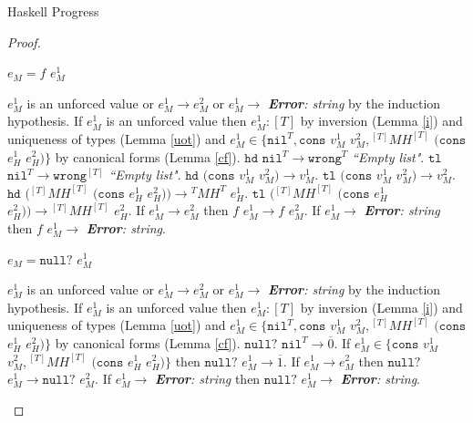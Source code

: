 \begin{theorem}{Haskell Progress}
\begin{proof}
\begin{case}
\end{case}


\begin{case}

$e_{M}=f$ $e_{M}^{1}$

$e_{M}^{1}$ is an unforced value or $e_{M}^{1}\rightarrow e_{M}^{2}$ or $e_{M}^{1}\rightarrow$ \emph{\textbf{Error}: string} by the induction hypothesis.  If $e_{M}^{1}$ is an unforced value then $e_{M}^{1}:[T]$ by inversion (Lemma \ref{i}) and uniqueness of types (Lemma \ref{uot}) and $e_{M}^{1}\in\lbrace\mathtt{nil}^{T},\mathtt{cons}$ $v_{M}^{1}$ $v_{M}^{2},{^{[T]}M}H^{[T]}$ $(\mathtt{cons}$ $e_{H}^{1}$ $e_{H}^{2})\rbrace$ by canonical forms (Lemma \ref{cf}).  $\mathtt{hd}$ $\mathtt{nil}^{T}\rightarrow\mathtt{wrong}^{T}$ \emph{``Empty list"}.  $\mathtt{tl}$ $\mathtt{nil}^{T}\rightarrow\mathtt{wrong}^{[T]}$ \emph{``Empty list"}.  $\mathtt{hd}$ $(\mathtt{cons}$ $v_{M}^{1}$ $v_{M}^{2})\rightarrow v_{M}^{1}$.  $\mathtt{tl}$ $(\mathtt{cons}$ $v_{M}^{1}$ $v_{M}^{2})\rightarrow v_{M}^{2}$.  $\mathtt{hd}$ $({^{[T]}M}H^{[T]}$ $(\mathtt{cons}$ $e_{H}^{1}$ $e_{H}^{2}))\rightarrow{^{T}M}H^{T}$ $e_{H}^{1}$.  $\mathtt{tl}$ $({^{[T]}M}H^{[T]}$ $(\mathtt{cons}$ $e_{H}^{1}$ $e_{H}^{2}))\rightarrow{^{[T]}M}H^{[T]}$ $e_{H}^{2}$.  If $e_{M}^{1}\rightarrow e_{M}^{2}$ then $f$ $e_{M}^{1}\rightarrow f$ $e_{M}^{2}$.  If $e_{M}^{1}\rightarrow$ \emph{\textbf{Error}: string} then $f$ $e_{M}^{1}\rightarrow$ \emph{\textbf{Error}: string}.

\end{case}


\begin{case}

$e_{M}=\mathtt{null?}$ $e_{M}^{1}$

$e_{M}^{1}$ is an unforced value or $e_{M}^{1}\rightarrow e_{M}^{2}$ or $e_{M}^{1}\rightarrow$ \emph{\textbf{Error}: string} by the induction hypothesis.  If $e_{M}^{1}$ is an unforced value then $e_{M}^{1}:[T]$ by inversion (Lemma \ref{i}) and uniqueness of types (Lemma \ref{uot}) and $e_{M}^{1}\in\lbrace\mathtt{nil}^{T},\mathtt{cons}$ $v_{M}^{1}$ $v_{M}^{2},{^{[T]}M}H^{[T]}$ $(\mathtt{cons}$ $e_{H}^{1}$ $e_{H}^{2})\rbrace$ by canonical forms (Lemma \ref{cf}).  $\mathtt{null?}$ $\mathtt{nil}^{T}\rightarrow\overline{0}$.  If $e_{M}^{1}\in\lbrace\mathtt{cons}$ $v_{M}^{1}$ $v_{M}^{2},{^{[T]}M}H^{[T]}$ $(\mathtt{cons}$ $e_{H}^{1}$ $e_{H}^{2})\rbrace$ then $\mathtt{null?}$ $e_{M}^{1}\rightarrow\overline{1}$.  If $e_{M}^{1}\rightarrow e_{M}^{2}$ then $\mathtt{null?}$ $e_{M}^{1}\rightarrow\mathtt{null?}$ $e_{M}^{2}$.  If $e_{M}^{1}\rightarrow$ \emph{\textbf{Error}: string} then $\mathtt{null?}$ $e_{M}^{1}\rightarrow$ \emph{\textbf{Error}: string}.

\end{case}

\end{proof}

\end{theorem}
